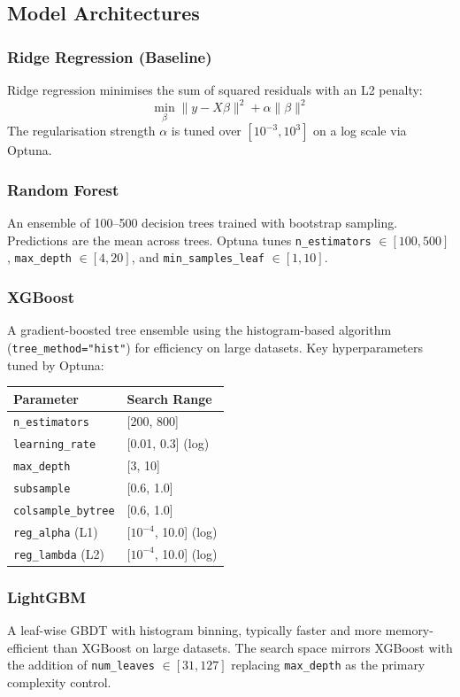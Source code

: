 \documentclass[11pt,a4paper]{article}
\begin{document}
\subsection{Model Architectures}
\subsubsection{Ridge Regression (Baseline)}
Ridge regression minimises the sum of squared residuals with an L2 penalty:
\[
\min_{\beta} \lVert y - X\beta \rVert^2 + \alpha \lVert \beta \rVert^2
\]
The regularisation strength $\alpha$ is tuned over $[10^{-3}, 10^3]$ on a log scale via Optuna.

\subsubsection{Random Forest}
An ensemble of 100--500 decision trees trained with bootstrap sampling. Predictions are the mean across trees. Optuna tunes \texttt{n\_estimators} $\in [100, 500]$, \texttt{max\_depth} $\in [4, 20]$, and \texttt{min\_samples\_leaf} $\in [1, 10]$.

\subsubsection{XGBoost}
A gradient-boosted tree ensemble using the histogram-based algorithm (\texttt{tree\_method="hist"}) for efficiency on large datasets. Key hyperparameters tuned by Optuna:

\begin{table}[h]
\centering
\begin{tabular}{ll}
\toprule
\textbf{Parameter} & \textbf{Search Range} \\
\midrule
\texttt{n\_estimators} & [200, 800] \\
\texttt{learning\_rate} & [0.01, 0.3] (log) \\
\texttt{max\_depth} & [3, 10] \\
\texttt{subsample} & [0.6, 1.0] \\
\texttt{colsample\_bytree} & [0.6, 1.0] \\
\texttt{reg\_alpha} (L1) & [$10^{-4}$, 10.0] (log) \\
\texttt{reg\_lambda} (L2) & [$10^{-4}$, 10.0] (log) \\
\bottomrule
\end{tabular}
\end{table}

\subsubsection{LightGBM}
A leaf-wise GBDT with histogram binning, typically faster and more memory-efficient than XGBoost on large datasets. The search space mirrors XGBoost with the addition of \texttt{num\_leaves} $\in [31, 127]$ replacing \texttt{max\_depth} as the primary complexity control.
\end{document}
